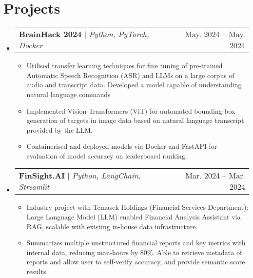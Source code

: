 \documentclass[letterpaper,11pt]{article}
\makeatletter
\newcommand{\resumeItem}[1]{
  \item\small{
    {#1 \vspace{-2pt}}
  }
}
\newcommand{\resumeProjectHeading}[2]{
    \item
    \begin{tabular*}{1.001\textwidth}{l@{\extracolsep{\fill}}r}
      \small#1 & \small #2\\
    \end{tabular*}\vspace{-7pt}
}
\newcommand{\resumeSubHeadingListStart}{\begin{itemize}[leftmargin=0.0in, label={}]}
\newcommand{\resumeSubHeadingListEnd}{\end{itemize}}
\newcommand{\resumeItemListStart}{\begin{itemize}}
\newcommand{\resumeItemListEnd}{\end{itemize}\vspace{-5pt}}
\makeatother
\begin{document}
\section{Projects}
    \vspace{-5pt}
    \resumeSubHeadingListStart
      \resumeProjectHeading
          {\textbf{BrainHack 2024} $|$ \emph{Python, PyTorch, Docker}}{May. 2024 -- May. 2024}
          \resumeItemListStart
            \resumeItem{Utilised transfer learning techniques for fine tuning of pre-trained Automatic Speech Recognition (ASR) and LLMs on a large corpus of audio and transcript data. Developed a model capable of understanding natural language commands}
            \resumeItem{Implemented Vision Transformers (ViT) for automated bounding-box generation of targets in image data based on natural language transcript provided by the LLM.}
            \resumeItem{Containerised and deployed models via Docker and FastAPI for evaluation of model accuracy on leaderboard ranking.}
          \resumeItemListEnd
          \vspace{-25pt}
    \resumeSubHeadingListEnd

    \resumeSubHeadingListStart
      \resumeProjectHeading
          {\textbf{FinSight.AI} $|$ \emph{Python, LangChain, Streamlit}}{Mar. 2024 -- Mar. 2024}
          \resumeItemListStart
            \resumeItem{Industry project with Temasek Holdings (Financial Services Department): Large Language Model (LLM) enabled Financial Analysis Assistant via RAG, scalable with existing in-house data infrastructure.}
            \resumeItem{Summarizes multiple unstructured financial reports and key metrics with internal data, reducing man-hours by 80\%. Able to retrieve metadata of reports and allow user to self-verify accuracy, and provide semantic score results.}
          \resumeItemListEnd
    \resumeSubHeadingListEnd

\end{document}
